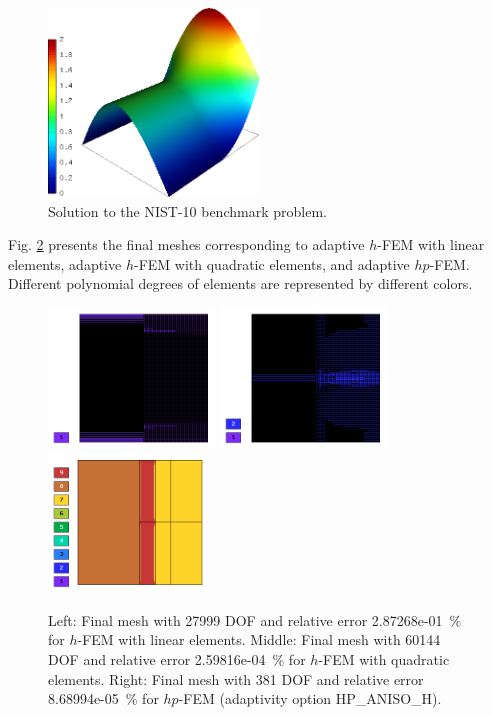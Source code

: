 \documentclass[12pt]{elsarticle}
\begin{document}
\begin{figure}[H]
\centering
\vspace{-6mm}
\includegraphics[height=5cm]{nist/nist-10/solution.png}
\vspace{-3mm}
\caption{Solution to the NIST-10 benchmark problem.}
\vspace{-3mm}
\label{fig:sln-nist10}
\end{figure}

Fig. \ref{fig:nist-10-hp-aniso} presents the final meshes corresponding to adaptive $h$-FEM with 
linear elements, adaptive $h$-FEM with quadratic elements, and adaptive $hp$-FEM. Different 
polynomial degrees of elements are represented by different colors. 

\begin{figure}[H]
\centering
\vspace{-3mm}
\includegraphics[height=3.7cm]{nist/nist-10/mesh_h1_aniso.png}
\includegraphics[height=3.7cm]{nist/nist-10/mesh_h2_aniso.png}
\includegraphics[height=3.7cm]{nist/nist-10/mesh_hp_aniso.png}
\vspace{-3mm}
\caption{
Left: Final mesh with 27999 DOF and relative error 2.87268e-01~\% for $h$-FEM with linear elements.
Middle: Final mesh with 60144 DOF and relative error 2.59816e-04~\% for $h$-FEM with quadratic elements. 
Right: Final mesh with 381 DOF and relative error 8.68994e-05~\% for $hp$-FEM (adaptivity option HP\_ANISO\_H).}
\vspace{-3mm}
\label{fig:nist-10-hp-aniso}
\end{figure}
\end{document}
